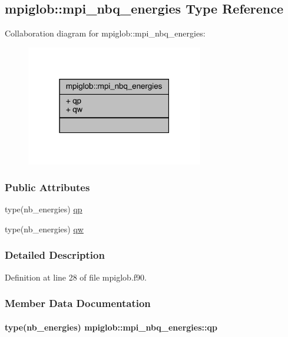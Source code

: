 \hypertarget{structmpiglob_1_1mpi__nbq__energies}{\subsection{mpiglob\-:\-:mpi\-\_\-nbq\-\_\-energies Type Reference}
\label{structmpiglob_1_1mpi__nbq__energies}
}


Collaboration diagram for mpiglob\-:\-:mpi\-\_\-nbq\-\_\-energies\-:
\nopagebreak
\begin{figure}[H]
\begin{center}
\leavevmode
\includegraphics[width=219pt]{structmpiglob_1_1mpi__nbq__energies__coll__graph}
\end{center}
\end{figure}
\subsubsection*{Public Attributes}
\begin{DoxyCompactItemize}
\item 
type(nb\-\_\-energies) \hyperlink{structmpiglob_1_1mpi__nbq__energies_ab83a7e6b185de3bc61d17b69a962e893}{qp}
\item 
type(nb\-\_\-energies) \hyperlink{structmpiglob_1_1mpi__nbq__energies_a3dc2c7eb0d0c9131d04c06c1861ef729}{qw}
\end{DoxyCompactItemize}


\subsubsection{Detailed Description}


Definition at line 28 of file mpiglob.\-f90.



\subsubsection{Member Data Documentation}
\hypertarget{structmpiglob_1_1mpi__nbq__energies_ab83a7e6b185de3bc61d17b69a962e893}{
\paragraph[{qp}]{\setlength{\rightskip}{0pt plus 5cm}type(nb\-\_\-energies) mpiglob\-::mpi\-\_\-nbq\-\_\-energies\-::qp}}\label{structmpiglob_1_1mpi__nbq__energies_ab83a7e6b185de3bc61d17b69a962e893}


